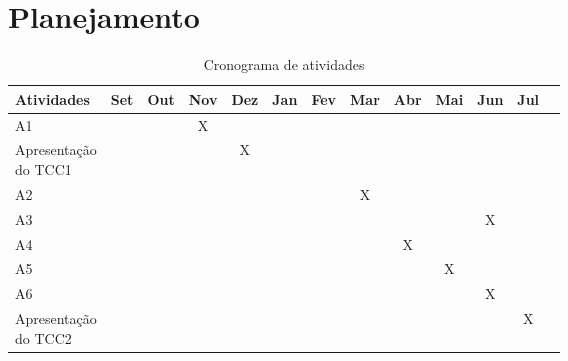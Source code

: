 \chapter[Planejamento]{Planejamento}

\renewcommand{\arraystretch}{1.2}
\begin{table}[ht]
    \centering
    \caption{Cronograma de atividades}
    \begin{tabular}{|l|c|c|c|c|c|c|c|c|c|c|c|c|}
    \hline
    \cellcolor[HTML]{008940}\textbf{Atividades} & \cellcolor[HTML]{008940}\textbf{Set}&\cellcolor[HTML]{008940}\textbf{Out} & \cellcolor[HTML]{008940}\textbf{Nov} & \cellcolor[HTML]{008940}\textbf{Dez} & \cellcolor[HTML]{008940}\textbf{Jan} & \cellcolor[HTML]{008940}\textbf{Fev} & \cellcolor[HTML]{008940}\textbf{Mar} & \cellcolor[HTML]{008940}\textbf{Abr} & \cellcolor[HTML]{008940}\textbf{Mai} & \cellcolor[HTML]{008940}\textbf{Jun} & \cellcolor[HTML]{008940}\textbf{Jul} \\ \hline
    A1  &   &   & X &   &   &   &   &   &   &   &   \\ \hline
    \parbox[t]{3cm}{Apresentação\\ do TCC1} &   &   &   & X &   &   &   &   &   &   &   \\ \hline
    A2  &   &   &   &   &   &   & X &   &   &   &   \\ \hline
    A3  &   &   &   &   &   &   &   &   &   & X &   \\ \hline
    A4  &   &   &   &   &   &   &   & X &   &   &   \\ \hline
    A5  &   &   &   &   &   &   &   &   & X &   &   \\ \hline
    A6  &   &   &   &   &   &   &   &   &   & X &   \\ \hline
    \parbox[t]{3cm}{Apresentação\\ do TCC2} &   &   &   &   &   &   &   &   &   &   & X \\ \hline
    \end{tabular}
    
    \label{tab:cronograma}
\end{table}